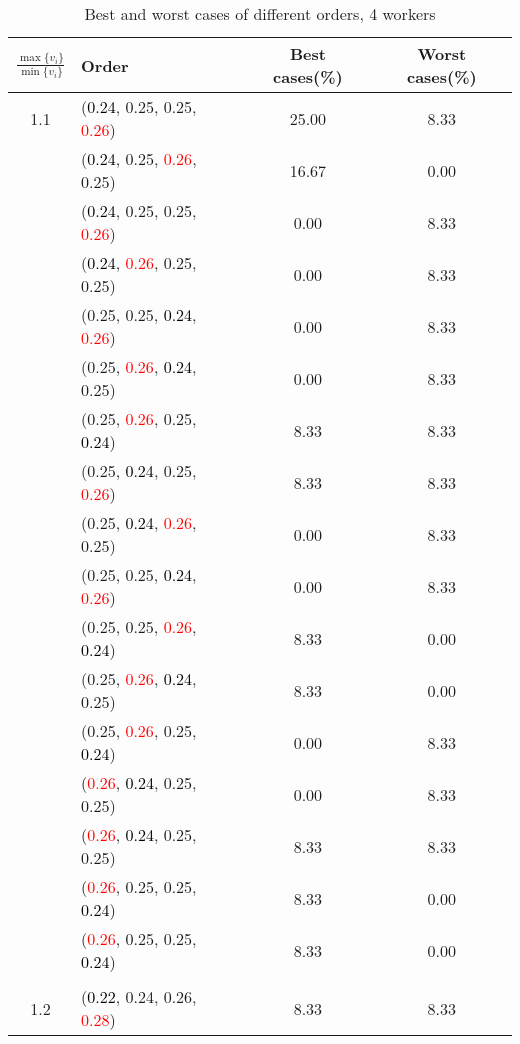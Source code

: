 \documentclass[10pt,a4paper]{report}
\begin{document}
\newpage\begin{center}
	\small
	\begin{longtable}{clcc}
		\caption{Best and worst cases of different orders, 4 workers}\\
		\toprule
		\setlength{\tabcolsep}{1mm}
		\renewcommand\baselinestretch{0.5}\selectfont
		$\frac{\max\{v_i\}}{\min\{v_i\}}$ & Order & Best cases(\%) & Worst cases(\%) \\
			\midrule		1.1			&(\textcolor{black}{0.24}, 0.25, 0.25, \textcolor{red}{0.26})&25.00&8.33\\
			&(\textcolor{black}{0.24}, 0.25, \textcolor{red}{0.26}, 0.25)&16.67&0.00\\
			&(\textcolor{black}{0.24}, 0.25, 0.25, \textcolor{red}{0.26})&0.00&8.33\\
			&(\textcolor{black}{0.24}, \textcolor{red}{0.26}, 0.25, 0.25)&0.00&8.33\\
			&(0.25, 0.25, \textcolor{black}{0.24}, \textcolor{red}{0.26})&0.00&8.33\\
			&(0.25, \textcolor{red}{0.26}, \textcolor{black}{0.24}, 0.25)&0.00&8.33\\
			&(0.25, \textcolor{red}{0.26}, 0.25, \textcolor{black}{0.24})&8.33&8.33\\
			&(0.25, \textcolor{black}{0.24}, 0.25, \textcolor{red}{0.26})&8.33&8.33\\
			&(0.25, \textcolor{black}{0.24}, \textcolor{red}{0.26}, 0.25)&0.00&8.33\\
			&(0.25, 0.25, \textcolor{black}{0.24}, \textcolor{red}{0.26})&0.00&8.33\\
			&(0.25, 0.25, \textcolor{red}{0.26}, \textcolor{black}{0.24})&8.33&0.00\\
			&(0.25, \textcolor{red}{0.26}, \textcolor{black}{0.24}, 0.25)&8.33&0.00\\
			&(0.25, \textcolor{red}{0.26}, 0.25, \textcolor{black}{0.24})&0.00&8.33\\
			&(\textcolor{red}{0.26}, \textcolor{black}{0.24}, 0.25, 0.25)&0.00&8.33\\
			&(\textcolor{red}{0.26}, \textcolor{black}{0.24}, 0.25, 0.25)&8.33&8.33\\
			&(\textcolor{red}{0.26}, 0.25, 0.25, \textcolor{black}{0.24})&8.33&0.00\\
			&(\textcolor{red}{0.26}, 0.25, 0.25, \textcolor{black}{0.24})&8.33&0.00\\
		&&&\\
		1.2			&(\textcolor{black}{0.22}, 0.24, 0.26, \textcolor{red}{0.28})&8.33&8.33\\

\end{longtable}
\end{center}
\end{document}
